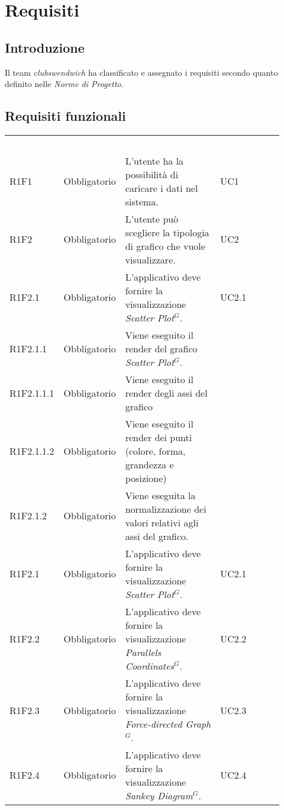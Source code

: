\section{Requisiti}
\subsection{Introduzione}
Il team \textit{clubswendwich} ha classificato e assegnato i requisiti secondo quanto definito nelle \textit{Norme di Progetto}.
\subsection{Requisiti funzionali}
{\renewcommand{\arraystretch}{1.5}
\begin{longtable}{p{0.12\linewidth}p{0.15\linewidth}p{0.50\linewidth}p{0.15\linewidth}}
	\rowcolor[RGB]{33, 73, 50}
	\textcolor{white}{\textbf{Codice}} & \textcolor{white}{\textbf{Classe}} & \textcolor{white}{\textbf{Descrizione}} &
    \textcolor{white}{\textbf{Riferimenti}}\\
    \rowcolor[RGB]{216, 235, 171}
    R1F1 & Obbligatorio & L'utente ha la possibilità di caricare i dati nel sistema. & UC1\\
    
    \rowcolor[RGB]{233, 245, 206}
    R1F2 & Obbligatorio & L'utente può scegliere la tipologia di grafico che vuole visualizzare. & UC2\\
    \rowcolor[RGB]{233, 245, 206}
    R1F2.1 & Obbligatorio & L'applicativo deve fornire la visualizzazione \textit{Scatter Plot$^{G}$}. & UC2.1\\
    \rowcolor[RGB]{216, 235, 171}
    R1F2.1.1 & Obbligatorio & Viene eseguito il render del grafico \textit{Scatter Plot$^{G}$}. & \\
    \rowcolor[RGB]{233, 245, 206}
    R1F2.1.1.1 & Obbligatorio & Viene eseguito il render degli assi del grafico & \\
    \rowcolor[RGB]{216, 235, 171}
    R1F2.1.1.2 & Obbligatorio & Viene eseguito il render dei punti (colore, forma, grandezza e posizione)& \\
    \rowcolor[RGB]{233, 245, 206}
    R1F2.1.2 & Obbligatorio & Viene eseguita la normalizzazione dei valori relativi agli assi del grafico. & \\
    \rowcolor[RGB]{216, 235, 171}
    R1F2.1 & Obbligatorio & L'applicativo deve fornire la visualizzazione \textit{Scatter Plot$^{G}$}. & UC2.1\\
    \rowcolor[RGB]{233, 245, 206}
    R1F2.2 & Obbligatorio & L'applicativo deve fornire la visualizzazione \textit{Parallels Coordinates$^{G}$}. & UC2.2\\
    \rowcolor[RGB]{216, 235, 171}
    R1F2.3 & Obbligatorio & L'applicativo deve fornire la visualizzazione \textit{Force-directed Graph$^{G}$}. & UC2.3\\
    \rowcolor[RGB]{233, 245, 206}
    R1F2.4 & Obbligatorio & L'applicativo deve fornire la visualizzazione \textit{Sankey Diagram$^{G}$}. & UC2.4\\
    

\end{longtable}}
